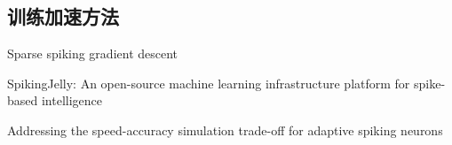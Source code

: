 \documentclass{SCIS2020cn}
\begin{document}
\subsection{训练加速方法}
Sparse spiking gradient descent

SpikingJelly: An open-source machine learning infrastructure platform for spike-based intelligence

Addressing the speed-accuracy simulation trade-off for adaptive spiking neurons










\makeentitle



\end{document}
